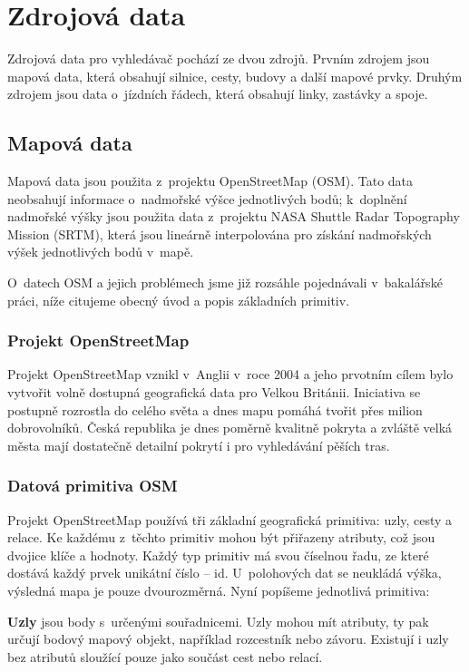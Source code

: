 \chapter{Zdrojová data}
\label{ch:zdrojova-data}

Zdrojová data pro vyhledávač pochází ze dvou zdrojů. Prvním zdrojem jsou mapová
data, která obsahují silnice, cesty, budovy a další mapové prvky. Druhým zdrojem
jsou data o~jízdních řádech, která obsahují linky, zastávky a spoje.

\section{Mapová data}
Mapová data jsou použita z~projektu OpenStreetMap\cite{OSM} (OSM). Tato data neobsahují
informace o~nadmořské výšce jednotlivých bodů; k~doplnění nadmořské výšky jsou
použita data z~projektu NASA Shuttle Radar Topography Mission (SRTM), která jsou
lineárně interpolována pro získání nadmořských výšek jednotlivých bodů v~mapě.

O~datech OSM a jejich problémech jsme již rozsáhle pojednávali v~bakalářské
práci\cite{bakalarka}, níže citujeme obecný úvod a popis základních primitiv. 
\newcommand{\tuc}{\bf}
\subsection{Projekt OpenStreetMap}
Projekt OpenStreetMap\cite{OSM} vznikl v~Anglii v~roce 2004 a jeho prvotním cílem bylo
vytvořit volně dostupná geografická data pro Velkou Británii. Iniciativa se
postupně rozrostla do celého světa a dnes mapu pomáhá tvořit přes milion
dobrovolníků. Česká republika je dnes poměrně kvalitně pokryta a zvláště velká
města mají dostatečně detailní pokrytí i pro vyhledávání pěších tras.

\subsection{Datová primitiva OSM} 
Projekt OpenStreetMap používá tři základní geografická primitiva: uzly, cesty a
relace. Ke každému z~těchto primitiv mohou být přiřazeny atributy, což jsou
dvojice klíče a hodnoty. Každý typ primitiv má svou číselnou řadu, ze které
dostává každý prvek unikátní číslo -- id. 
U~polohových dat se neukládá výška, výsledná mapa je pouze dvourozměrná.
Nyní popíšeme jednotlivá primitiva:

{\tuc Uzly} jsou body s~určenými souřadnicemi. Uzly mohou mít atributy, ty pak
určují bodový mapový objekt, například rozcestník nebo závoru. Existují i uzly
bez atributů sloužící pouze jako součást cest nebo relací.

